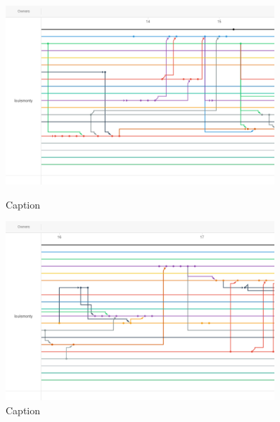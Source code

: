 \begin{figure}
    \includegraphics[width=0.9\textwidth]{Report/root/3.png}
    \caption{Caption}
    \includegraphics[width=0.9\textwidth]{Report/root/4.png}
    \caption{Caption}
    \end{figure}

